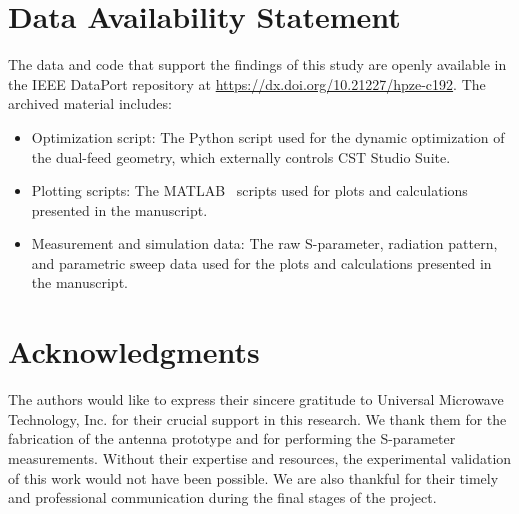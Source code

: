 \documentclass[journal,9pt]{IEEEtran}
\begin{document}
\section*{Data Availability Statement}
\label{sec:data-availability-statement}

The data and code that support the findings of this study are openly available in the IEEE DataPort repository at \url{https://dx.doi.org/10.21227/hpze-c192}. The archived material includes:
\begin{itemize}
    \item Optimization script: The Python script used for the dynamic optimization of the dual-feed geometry, which externally controls CST Studio Suite.
    \item Plotting scripts: The MATLAB~\cite{matlab} scripts used for plots and calculations presented in the manuscript.
    \item Measurement and simulation data: The raw S-parameter, radiation pattern, and parametric sweep data used for the plots and calculations presented in the manuscript.
\end{itemize}


\section*{Acknowledgments}
\label{sec:acknowledgments}

The authors would like to express their sincere gratitude to Universal Microwave Technology, Inc. for their crucial support in this research. We thank them for the fabrication of the antenna prototype and for performing the S-parameter measurements. Without their expertise and resources, the experimental validation of this work would not have been possible. We are also thankful for their timely and professional communication during the final stages of the project.
\end{document}
